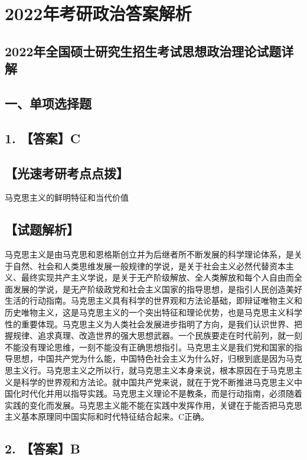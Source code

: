 \documentclass[UTF8,11pt]{ctexart}
\begin{document}
\section*{2022年考研政治答案解析}
\subsection*{2022年全国硕士研究生招生考试思想政治理论试题详解}

\subsection*{一、单项选择题}

\subsection*{1. 【答案】C}

\subsection*{【光速考研考点点拨】}

马克思主义的鲜明特征和当代价值


\subsection*{【试题解析】}

马克思主义是由马克思和恩格斯创立并为后继者所不断发展的科学理论体系，是关于自然、社会和人类思维发展一般规律的学说，是关于社会主义必然代替资本主义、最终实现共产主义学说，是关于无产阶级解放、全人类解放和每个人自由而全面发展的学说，是无产阶级政党和社会主义国家的指导思想，是指引人民创造美好生活的行动指南。马克思主义具有科学的世界观和方法论基础，即辩证唯物主义和历史唯物主义，这是马克思主义的一个突出特征和理论优势，也是马克思主义科学性的重要体现。马克思主义为人类社会发展进步指明了方向，是我们认识世界、把握规律、追求真理、改造世界的强大思想武器。一个民族要走在时代前列，就一刻不能没有理论思维，一刻不能没有正确思想指引。马克思主义是我们党和国家的指导思想，中国共产党为什么能，中国特色社会主义为什么好，归根到底是因为马克思主义行。马克思主义之所以行，就马克思主义本身来说，根本原因在于马克思主义是科学的世界观和方法论。就中国共产党来说，就在于党不断推进马克思主义中国化时代化并用以指导实践。马克思主义理论不是教条，而是行动指南，必须随着实践的变化而发展。马克思主义能不能在实践中发挥作用，关键在于能否把马克思主义基本原理同中国实际和时代特征结合起来。C正确。


\subsection*{2. 【答案】B}
\end{document}
